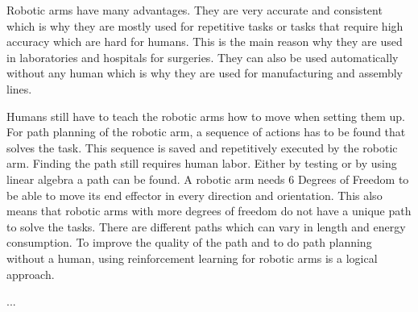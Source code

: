 \vspace{0.5cm}

Robotic arms have many advantages. They are very accurate and consistent which is why they are mostly used for repetitive tasks or tasks that require high accuracy which are hard for humans. 
This is the main reason why they are used in laboratories and hospitals for surgeries. They can also be used automatically without any human which is why they are used for manufacturing and assembly lines. 

\vspace{0.5cm}

Humans still have to teach the robotic arms how to move when 
setting them up. For path planning of the robotic arm, a sequence of actions has to be found that solves the task. This sequence is saved and repetitively executed by the robotic arm. Finding the path still requires human labor. Either by testing or by using linear algebra a path can be found. 
A robotic arm needs 6 Degrees of Freedom to be able to move its end effector in every direction and orientation. This also means that robotic arms with more degrees of freedom do not have a unique path to solve the tasks. There are different paths which can vary in length and energy consumption.
To improve the quality of the path and to do path planning without a human, using reinforcement learning for robotic arms is a logical approach. 

\vspace{0.5cm}


...

\vspace{0.5cm}


